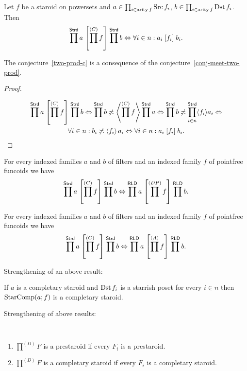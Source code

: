 \begin{conjecture}
\label{two-prod-c}Let $f$ be a staroid on powersets and $a\in\prod_{i\in\operatorname{arity} f}\operatorname{Src} f_{i}$,
$b\in\prod_{i\in\operatorname{arity} f}\operatorname{Dst} f_{i}$. Then 
\[
\prod^{\mathsf{Strd}}a\mathrel{\left[\prod^{(C)}f\right]}\prod^{\mathsf{Strd}}b\Leftrightarrow\forall i\in n:a_{i}\mathrel{\left[f_{i}\right]}b_{i}.
\]
\end{conjecture}
\begin{prop}
The conjecture~\ref{two-prod-c} is a consequence of the conjecture~\ref{conj-meet-two-prod}.\end{prop}
\begin{proof}
~

\begin{multline*}
\prod^{\mathsf{Strd}}a\mathrel{\left[\prod^{(C)}f\right]}\prod^{\mathsf{Strd}}b\Leftrightarrow\prod^{\mathsf{Strd}}b\not\asymp\left\langle \prod^{(C)}f\right\rangle\prod^{\mathsf{Strd}}a\Leftrightarrow\prod^{\mathsf{Strd}}b\not\asymp\prod_{i\in n}^{\mathsf{Strd}}\langle f_{i}\rangle a_{i}\Leftrightarrow\\
\forall i\in n:b_{i}\not\asymp\left\langle f_{i}\right\rangle a_{i}\Leftrightarrow\forall i\in n:a_{i}\mathrel{\left[f_{i}\right]}b_{i}.
\end{multline*}
\end{proof}
\begin{conjecture}
For every indexed families $a$ and $b$ of filters and an indexed
family $f$ of pointfree funcoids we have 
\[
\prod^{\mathsf{Strd}}a\mathrel{\left[\prod^{(C)}f\right]}\prod^{\mathsf{Strd}}b\Leftrightarrow\prod^{\mathsf{RLD}}a\mathrel{\left[\prod^{(DP)}f\right]}\prod^{\mathsf{RLD}}b.
\]

\end{conjecture}

\begin{conjecture}
For every indexed families $a$ and $b$ of filters and an indexed
family $f$ of pointfree funcoids we have 
\[
\prod^{\mathsf{Strd}}a\mathrel{\left[\prod^{(C)}f\right]}\prod^{\mathsf{Strd}}b\Leftrightarrow\prod^{\mathsf{RLD}}a\mathrel{\left[\prod^{(A)}f\right]}\prod^{\mathsf{RLD}}b.
\]

\end{conjecture}
Strengthening of an above result:
\begin{conjecture}
If $a$ is a completary staroid and $\operatorname{Dst} f_{i}$ is a starrish poset
for every $i\in n$ then $\operatorname{StarComp}(a;f)$ is a completary staroid.
\end{conjecture}
Strengthening of above results:
\begin{conjecture}
~
\begin{enumerate}
\item $\prod^{(D)}F$ is a prestaroid if every $F_{i}$ is a prestaroid.
\item $\prod^{(D)}F$ is a completary staroid if every $F_{i}$ is a completary
staroid.
\end{enumerate}
\end{conjecture}

